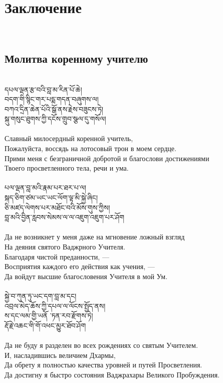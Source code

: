\section{Заключение}
\\
\subsection{Молитва коренному учителю}
\\
\ti
དཔལ་ལྡན་རྩ་བའི་བླ་མ་རིན་པོ་ཆེ། \\
བདག་གི་སྙིང་གར་པདྨ་གདན་བཞུགས་ལ། \\
བཀའ་དྲིན་ཆེན་པོའི་སྒོ་ནས་རྗེས་བཟུངས་ཏེ། \\
སྐུ་གསུང་ཐུགས་ཀྱི་དངོས་གྲུབ་སྩལ་དུ་གསོལ།\\
\\
\ru
Славный милосердный коренной учитель,\\
Пожалуйста, воссядь на лотосовый трон в моем сердце.\\
Прими меня с безграничной добротой и благослови достижениями\\
Твоего просветленного тела, речи и ума.\\
\\
\ti
པལ་ལྡན་བླ་མའི་རྣམ་པར་ཐར་པ་ལ། \\
སྐད་ཅིག་ཙམ་ཡང་ཡང་ལོག་ལྟ་མི་སྐྱེ་ཞིང། \\
ཅི་མཛད་ལེགས་པར་མཐོང་བའི་མོས་གུས་ཀྱིས། \\
བླ་མའི་བྱིན་རླབས་སེམས་ལ་ལ་འཇུག་འཇུག་པར་ཤོག \\
\\
\ru
Да не возникнет у меня даже на мгновение ложный взгляд\\
На деяния святого Ваджрного Учителя.\\
Благодаря чистой преданности, —\\
Восприятия каждого его действия как учения, —\\
Да войдут высшие благословения Учителя в мой Ум.\\
\\
\ti
སྐྱེ་བ་ཀུན་ཏུ་ཡང་དག་བླ་མ་དང། \\
འབྲལ་མེད་ཆོས་ཀྱི་དཔལ་ལ་ལོངས་སྤྱོད་ནས། \\
ས་དང་ལམ་གྱི་ཡནོ ་ཏན་རབ་རྫོགས་ཏེ། \\
རྡོ་རྗེ་འཆང་གི་གོ་འཕང་མྱུར་ཐོབ་ཤོག \\
\\
\ru
Да не буду я разделен во всех рождениях со святым Учителем.\\
И, насладившись величием Дхармы,\\
Да обрету я полностью качества уровней и путей Просветления.\\
Да достигну я быстро состояния Ваджрахары Великого Пробуждения.\\
\\
